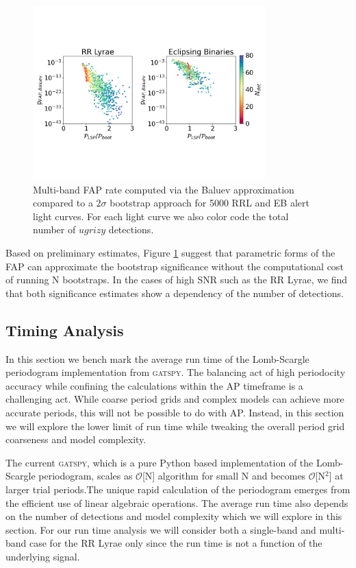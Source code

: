 \documentclass[DM,authoryear,toc]{lsstdoc}
\begin{document}
\begin{figure}
  \includegraphics[width=0.8\textwidth]{figures/fap_approximation_mlsp.pdf}
  \centering 
  \caption{Multi-band FAP rate computed via the Baluev approximation compared to a $2\sigma$ bootstrap approach for 5000 RRL and EB alert light curves.
For each light curve we also color code the total number of $ugrizy$ detections.}
  \label{fig:boot}
\end{figure}

Based on preliminary estimates, Figure \ref{fig:boot} suggest that parametric forms of the FAP can approximate the bootstrap significance without the computational cost of running N bootstraps.
In the cases of high SNR such as the RR Lyrae, we find that both significance estimates show a dependency of the number of detections.


\subsection{Timing Analysis}

In this section we bench mark the average run time of the Lomb-Scargle periodogram implementation from \textsc{gatspy}.
The balancing act of high periodocity accuracy while confining the calculations within the AP timeframe is a challenging act.
While coarse period grids  and complex models can achieve more accurate periods, this will not be possible to do with AP.
Instead, in this section we will explore the lower limit of run time while tweaking the overall period grid coarseness and model complexity.

The current \textsc{gatspy}, which is a pure Python based implementation of the Lomb-Scargle periodogram, scales as  $\mathcal{O}$[N] algorithm for small N and becomes $\mathcal{O}$[N$^2$] at larger trial periods.The unique rapid calculation of the periodogram emerges from the efficient use of linear algebraic operations.
The average run time also depends on the number of detections and model complexity which we will explore in this section.
For our run time analysis we will consider both a single-band and multi-band case for the RR Lyrae only since the run time is not a function of the underlying signal.
\end{document}
